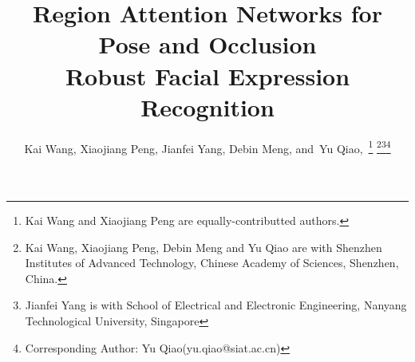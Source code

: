 \documentclass[journal]{IEEEtran}
\begin{document}
\title{Region Attention Networks for Pose and Occlusion\\ Robust Facial Expression Recognition}


\author{Kai Wang,
        Xiaojiang Peng,
        Jianfei Yang,
        Debin Meng,
        and~Yu Qiao,~\thanks{Kai Wang and Xiaojiang Peng are equally-contributted authors.}
\thanks{Kai Wang, Xiaojiang Peng, Debin Meng and Yu Qiao are with Shenzhen Institutes of Advanced Technology, Chinese Academy of Sciences, Shenzhen, China.}\thanks{Jianfei Yang is with School of Electrical and Electronic Engineering, Nanyang Technological University, Singapore}\thanks{Corresponding Author: Yu Qiao(yu.qiao@siat.ac.cn)}}



















\maketitle
\end{document}
